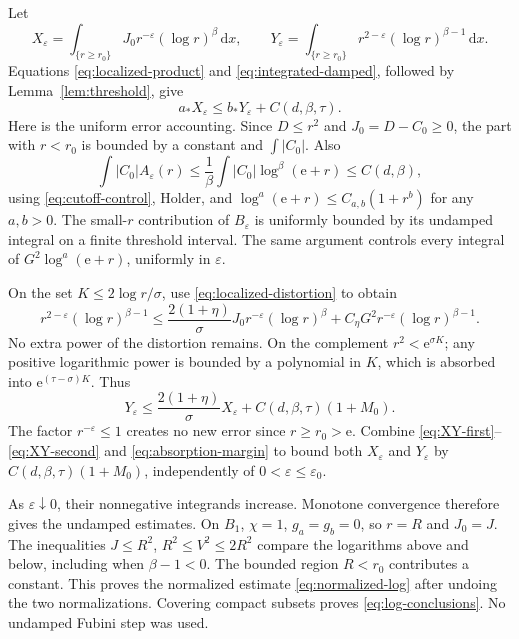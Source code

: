 \documentclass[11pt,a4paper]{article}
\numberwithin{equation}{section}
\theoremstyle{definition}
\theoremstyle{remark}\newtheorem{remark}[theorem]{Remark}
\newcommand{\ee}{\mathrm e}
\newcommand{\dd}{\,\mathrm dx}
\begin{document}
Let
\[
 X_\varepsilon=\int_{\{r\geq r_0\}}
 J_0r^{-\varepsilon}(\log r)^\beta\dd,\qquad
 Y_\varepsilon=\int_{\{r\geq r_0\}}
 r^{2-\varepsilon}(\log r)^{\beta-1}\dd.
\]
Equations \eqref{eq:localized-product} and
\eqref{eq:integrated-damped}, followed by Lemma~\ref{lem:threshold}, give
\begin{equation}\label{eq:XY-first}
 a_*X_\varepsilon\leq b_*Y_\varepsilon+C(d,\beta,\tau).
\end{equation}
Here is the uniform error accounting. Since \(D\leq r^2\) and
\(J_0=D-C_0\geq0\), the part with \(r<r_0\) is bounded by a constant
and \(\int|C_0|\). Also
\[
 \int |C_0|A_\varepsilon(r)
 \leq\frac1\beta\int |C_0|\log^\beta(\ee+r)\leq C(d,\beta),
\]
using \eqref{eq:cutoff-control}, Holder, and
\(\log^a(\ee+r)\leq C_{a,b}(1+r^b)\) for any \(a,b>0\).
The small-\(r\) contribution of \(B_\varepsilon\) is uniformly bounded
by its undamped integral on a finite threshold interval. The same
argument controls every integral of
\(G^2\log^a(\ee+r)\), uniformly in \(\varepsilon\).

On the set \(K\leq2\log r/\sigma\), use
\eqref{eq:localized-distortion} to obtain
\[
 r^{2-\varepsilon}(\log r)^{\beta-1}
 \leq\frac{2(1+\eta)}{\sigma}
       J_0r^{-\varepsilon}(\log r)^\beta
       +C_\eta G^2r^{-\varepsilon}(\log r)^{\beta-1}.
\]
No extra power of the distortion remains.
On the complement \(r^2<\ee^{\sigma K}\);
any positive logarithmic power is bounded by a polynomial in \(K\),
which is absorbed into \(\ee^{(\tau-\sigma)K}\). Thus
\begin{equation}\label{eq:XY-second}
 Y_\varepsilon\leq\frac{2(1+\eta)}{\sigma}X_\varepsilon
                         +C(d,\beta,\tau)(1+M_0).
\end{equation}
The factor \(r^{-\varepsilon}\leq1\) creates no new error since
\(r\geq r_0>\ee\).
Combine \eqref{eq:XY-first}--\eqref{eq:XY-second} and
\eqref{eq:absorption-margin} to bound both \(X_\varepsilon\) and
\(Y_\varepsilon\) by \(C(d,\beta,\tau)(1+M_0)\), independently of
\(0<\varepsilon\leq\varepsilon_0\).

As \(\varepsilon\downarrow0\), their nonnegative integrands increase.
Monotone convergence therefore gives the undamped estimates. On \(B_1\),
\(\chi=1\), \(g_a=g_b=0\), so \(r=R\) and \(J_0=J\).
The inequalities \(J\leq R^2\), \(R^2\leq V^2\leq2R^2\) compare
the logarithms above and below, including when \(\beta-1<0\).
The bounded region \(R<r_0\) contributes a constant. This proves
the normalized estimate \eqref{eq:normalized-log} after undoing the
two normalizations. Covering compact subsets proves
\eqref{eq:log-conclusions}. No undamped Fubini step was used.
\end{document}

